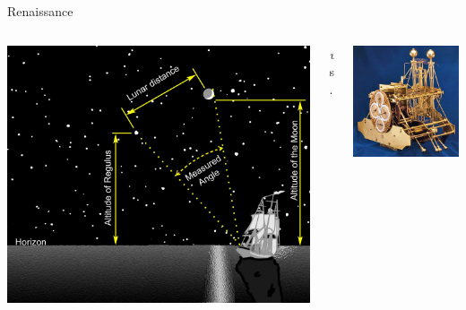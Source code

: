 \begin{frame}{Renaissance}
\begin{columns}
	\begin{column}{0.40\linewidth}
		\centering
		\includegraphics[height=0.35\paperheight]{../resources/illustrations/lunar-distance} \\
	\end{column}
	\begin{column}{0.09\linewidth} \centering \huge \emph vs. \end{column}
	\begin{column}{0.40\linewidth}
		\centering
		\includegraphics[height=0.35\paperheight]{../resources/illustrations/harrison} \\

\end{column}
\end{columns}
\end{frame}
